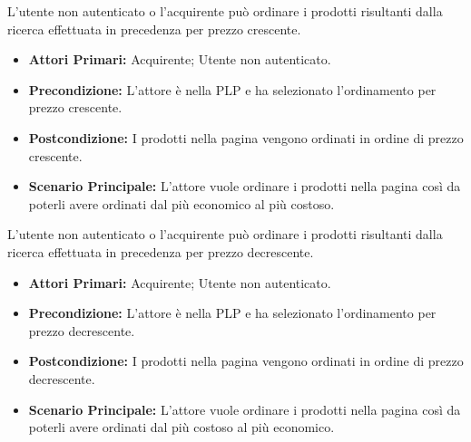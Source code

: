 
L'utente non autenticato o l'acquirente può ordinare i prodotti risultanti dalla ricerca effettuata in precedenza per prezzo crescente.
\begin{itemize}
    \item \textbf{Attori Primari:} Acquirente; Utente non autenticato.
    \item \textbf{Precondizione:} L'attore è nella PLP e ha selezionato l'ordinamento per prezzo crescente.
    \item \textbf{Postcondizione:} I prodotti nella pagina vengono ordinati in ordine di prezzo crescente.
    \item \textbf{Scenario Principale:} L'attore vuole ordinare i prodotti nella pagina così da poterli avere ordinati dal più economico al più costoso.
\end{itemize}

L'utente non autenticato o l'acquirente può ordinare i prodotti risultanti dalla ricerca effettuata in precedenza per prezzo decrescente.
\begin{itemize}
    \item \textbf{Attori Primari:} Acquirente; Utente non autenticato.
    \item \textbf{Precondizione:} L'attore è nella PLP e ha selezionato l'ordinamento per prezzo decrescente.
    \item \textbf{Postcondizione:} I prodotti nella pagina vengono ordinati in ordine di prezzo decrescente.
    \item \textbf{Scenario Principale:} L'attore vuole ordinare i prodotti nella pagina così da poterli avere ordinati dal più costoso al più economico.
\end{itemize}

